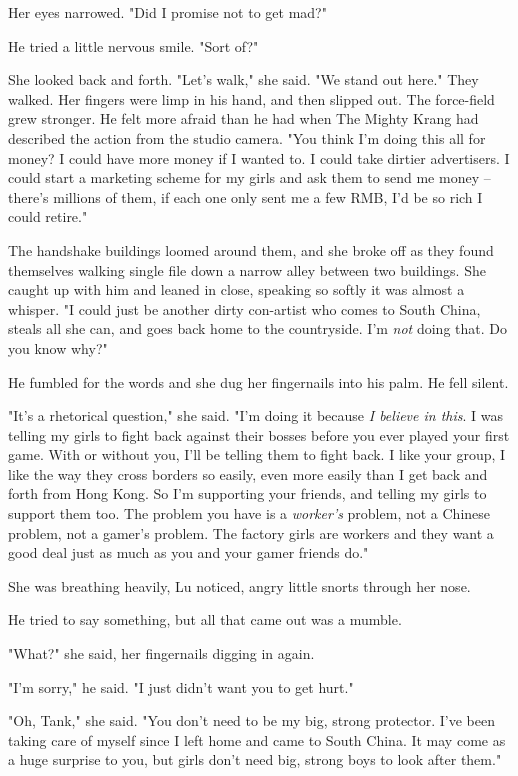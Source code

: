 Her eyes narrowed. "Did I promise not to get mad?"

He tried a little nervous smile. "Sort of?"

She looked back and forth. "Let's walk," she said. "We stand out
here." They walked. Her fingers were limp in his hand, and then
slipped out. The force-field grew stronger. He felt more afraid
than he had when The Mighty Krang had described the action from the
studio camera. "You think I'm doing this all for money? I could
have more money if I wanted to. I could take dirtier advertisers. I
could start a marketing scheme for my girls and ask them to send me
money -- there's millions of them, if each one only sent me a few
RMB, I'd be so rich I could retire."

The handshake buildings loomed around them, and she broke off as
they found themselves walking single file down a narrow alley
between two buildings. She caught up with him and leaned in close,
speaking so softly it was almost a whisper. "I could just be
another dirty con-artist who comes to South China, steals all she
can, and goes back home to the countryside. I'm \emph{not} doing
that. Do you know why?"

He fumbled for the words and she dug her fingernails into his palm.
He fell silent.

"It's a rhetorical question," she said. "I'm doing it because
\emph{I believe in this}. I was telling my girls to fight back
against their bosses before you ever played your first game. With
or without you, I'll be telling them to fight back. I like your
group, I like the way they cross borders so easily, even more
easily than I get back and forth from Hong Kong. So I'm supporting
your friends, and telling my girls to support them too. The problem
you have is a \emph{worker's} problem, not a Chinese problem, not a
gamer's problem. The factory girls are workers and they want a good
deal just as much as you and your gamer friends do."

She was breathing heavily, Lu noticed, angry little snorts through
her nose.

He tried to say something, but all that came out was a mumble.

"What?" she said, her fingernails digging in again.

"I'm sorry," he said. "I just didn't want you to get hurt."

"Oh, Tank," she said. "You don't need to be my big, strong
protector. I've been taking care of myself since I left home and
came to South China. It may come as a huge surprise to you, but
girls don't need big, strong boys to look after them."

